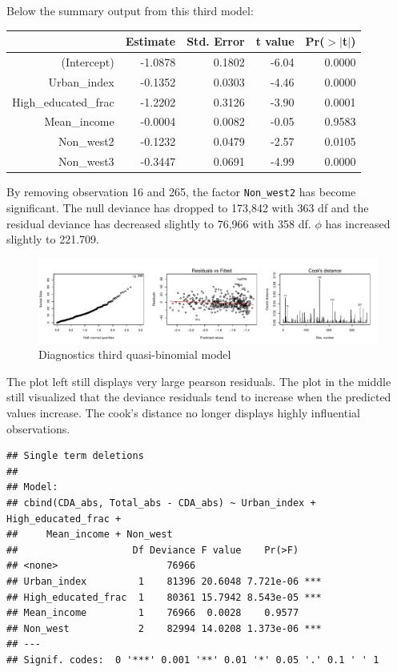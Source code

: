 \documentclass[11pt,]{article}
\begin{document}
Below the summary output from this third model:

\begin{table}[ht]
\centering
\begin{tabular}{rrrrr}
  \hline
 & Estimate & Std. Error & t value & Pr($>$$|$t$|$) \\ 
  \hline
(Intercept) & -1.0878 & 0.1802 & -6.04 & 0.0000 \\ 
  Urban\_index & -0.1352 & 0.0303 & -4.46 & 0.0000 \\ 
  High\_educated\_frac & -1.2202 & 0.3126 & -3.90 & 0.0001 \\ 
  Mean\_income & -0.0004 & 0.0082 & -0.05 & 0.9583 \\ 
  Non\_west2 & -0.1232 & 0.0479 & -2.57 & 0.0105 \\ 
  Non\_west3 & -0.3447 & 0.0691 & -4.99 & 0.0000 \\ 
   \hline
\end{tabular}
\end{table}

By removing observation 16 and 265, the factor \texttt{Non\_west2} has
become significant. The null deviance has dropped to 173,842 with 363 df
and the residual deviance has decreased slightly to 76,966 with 358 df.
\(\phi\) has increased slightly to 221.709.

\begin{figure}[H]

{\centering \includegraphics{Report_files/figure-latex/unnamed-chunk-19-1} 

}

\caption{\label{ass_mdl3}Diagnostics third quasi-binomial model}\label{fig:unnamed-chunk-19}
\end{figure}

The plot left still displays very large pearson residuals. The plot in
the middle still visualized that the deviance residuals tend to increase
when the predicted values increase. The cook's distance no longer
displays highly influential observations.

\begin{verbatim}
## Single term deletions
## 
## Model:
## cbind(CDA_abs, Total_abs - CDA_abs) ~ Urban_index + High_educated_frac + 
##     Mean_income + Non_west
##                    Df Deviance F value    Pr(>F)    
## <none>                   76966                      
## Urban_index         1    81396 20.6048 7.721e-06 ***
## High_educated_frac  1    80361 15.7942 8.543e-05 ***
## Mean_income         1    76966  0.0028    0.9577    
## Non_west            2    82994 14.0208 1.373e-06 ***
## ---
## Signif. codes:  0 '***' 0.001 '**' 0.01 '*' 0.05 '.' 0.1 ' ' 1
\end{verbatim}
\end{document}
